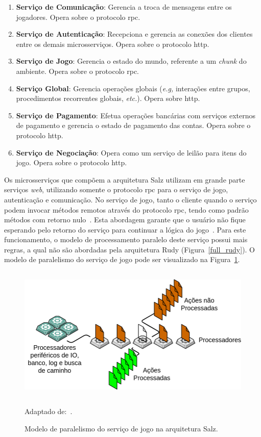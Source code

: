 \begin{enumerate}
  \item \textbf{Serviço de Comunicação}: Gerencia a troca de mensagens entre os jogadores. Opera sobre o protocolo \ac{rpc}.
  \item \textbf{Serviço de Autenticação}: Recepciona e gerencia as conexões dos clientes entre os demais microsserviços. Opera sobre o protocolo \ac{http}.
  \item \textbf{Serviço de Jogo}: Gerencia o estado do mundo, referente a um \textit{chunk} do ambiente. Opera sobre o protocolo \ac{rpc}.
  \item \textbf{Serviço Global}: Gerencia operações globais (\textit{e.g,} interações entre grupos, procedimentos recorrentes globais, \textit{etc.}). Opera sobre \ac{http}.
  \item \textbf{Serviço de Pagamento}: Efetua operações bancárias com serviços externos de pagamento e gerencia o estado de pagamento das contas. Opera sobre o protocolo \ac{http}.
  \item \textbf{Serviço de Negociação}: Opera como um serviço de leilão para itens do jogo. Opera sobre o protocolo \ac{http}.
\end{enumerate}



Os microsserviços que compõem a arquitetura Salz utilizam em grande parte serviços \textit{web}, utilizando somente o protocolo \ac{rpc} para o serviço de jogo, autenticação e comunicação.
%
No serviço de jogo, tanto o cliente quando o serviço podem invocar métodos remotos através do protocolo \ac{rpc}, tendo como padrão métodos com retorno nulo~\cite{salz_albion, photon_serialization}.
%
Esta abordagem garante que o usuário não fique esperando pelo retorno do serviço para continuar a lógica do jogo~\cite{faber}.
%
Para este funcionamento, o modelo de processamento paralelo deste serviço possui mais regras, a qual não são abordadas pela arquitetura Rudy (Figura~\ref{full_rudy}).
%
O modelo de paralelismo do serviço de jogo pode ser visualizado na Figura~\ref{salz_thread_model}.


\begin{figure}[htb!]
  \caption{Modelo de paralelismo do serviço de jogo na arquitetura Salz.}
  \label{salz_thread_model}
  \includegraphics[height=6.5cm]{arquiteturas/salz_thread_model.png}
  \centering

  Adaptado de:~\cite{salz_albion, willson}.
\end{figure}



